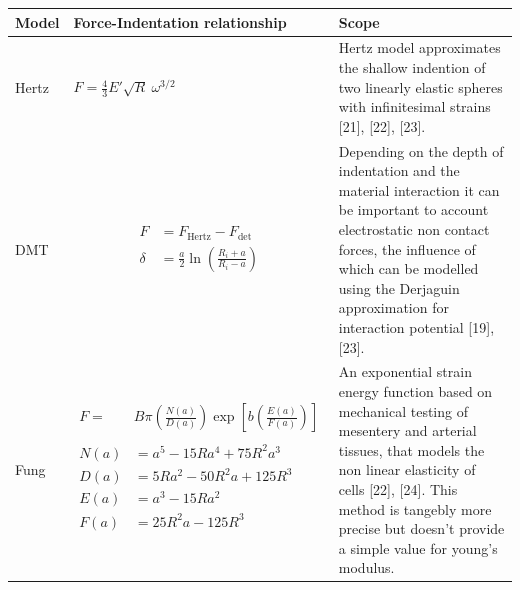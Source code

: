 \documentclass[
  paper=a4,
  ,captions=tableheading
]{scrartcl}
\begin{document}
\begin{longtable}[]{@{}
  >{\raggedright\arraybackslash}p{}
  >{\raggedright\arraybackslash}p{}
  >{\raggedright\arraybackslash}p{}@{}}
\toprule\noalign{}
\begin{minipage}[b]{\linewidth}\raggedright
Model
\end{minipage} & \begin{minipage}[b]{\linewidth}\raggedright
Force-Indentation relationship
\end{minipage} & \begin{minipage}[b]{\linewidth}\raggedright
Scope
\end{minipage} \\
\midrule\noalign{}
\endhead
\bottomrule\noalign{}
\endlastfoot
Hertz & \(F = \frac{4}{3}E' \sqrt{R} \ \omega^{3/2}\) & Hertz model
approximates the shallow indention of two linearly elastic spheres with
infinitesimal strains {[}21{]}, {[}22{]}, {[}23{]}. \\
DMT &
\begin{minipage}[t]{\linewidth}
\begin{equation*}
\begin{aligned}
F &= F_{\text{Hertz}} - F_{\text{det}} \\
\delta &= \frac{a}{2} \ln \left( \frac{R_i + a}{R_i - a} \right)
\end{aligned}
\end{equation*}
\end{minipage}
& Depending on the depth of indentation and the material interaction it
can be important to account electrostatic non contact forces, the
influence of which can be modelled using the Derjaguin approximation for
interaction potential {[}19{]}, {[}23{]}. \\
Fung &
\begin{minipage}[t]{\linewidth}
\begin{equation*}
\begin{aligned}
F = &B\pi \left( \frac{N(a)}{D(a)} \right)
\exp\left[ b \left( \frac{E(a)}{F(a)} \right) \right] \\ \\
N(a) &= a^5 - 15Ra^4 + 75R^2a^3 \\
D(a) &= 5Ra^2 - 50R^2a + 125R^3 \\
E(a) &= a^3 - 15Ra^2 \\
F(a) &= 25R^2a - 125R^3 \\
\end{aligned}
\end{equation*}
\end{minipage}
& An exponential strain energy function based on mechanical testing of
mesentery and arterial tissues, that models the non linear elasticity of
cells {[}22{]}, {[}24{]}. This method is tangebly more precise but
doesn't provide a simple value for young's modulus. \\
\end{longtable}
\end{document}
